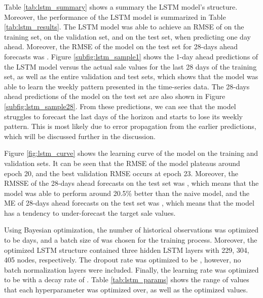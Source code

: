 Table \ref{tab:lstm_summary} shows a summary the LSTM model's structure. 
Moreover, the performance of the LSTM model is summarized in Table \ref{tab:lstm_results}.
The LSTM model was able to achieve an RMSE of \lstmTrnRMSE{} on the training set, \lstmValRMSE{} on the validation set, and \lstmTstRMSE{} on the test set, when predicting one day ahead.
Moreover, the RMSE of the model on the test set for 28-days ahead forecasts was \lstmTstMonRMSE{}.
Figure \ref{subfig:lstm_sample1} shows the 1-day ahead predictions of the LSTM model versus the actual sale values for the last 28 days of the training set, as well as the entire validation and test sets, which shows that the model was able to learn the weekly pattern presented in the time-series data.
The 28-days ahead predictions of the model on the test set are also shown in Figure \ref{subfig:lstm_sample28}.
From these predictions, we can see that the model struggles to forecast the last days of the horizon and starts to lose its weekly pattern.
This is most likely due to error propagation from the earlier predictions, which will be discussed further in the discussion.

Figure \ref{fig:lstm_curve} shows the learning curve of the model on the training and validation sets. 
It can be seen that the RMSE of the model plateaus around epoch 20, and the best validation RMSE occurs at epoch 23.
Moreover, the RMSSE of the 28-days ahead forecasts on the test set was \lstmTstMonRMSSE{}, which means that the model was able to perform around 20.5\% better than the naive model, and the ME of 28-days ahead forecasts on the test set was \lstmTstMonME{}, which means that the model has a tendency to under-forecast the target sale values. 

Using Bayesian optimization, the number of historical observations was optimized to be \lstmParamsSteps{} days, and a batch size of \lstmParamsBatch{} was chosen for the training process. 
Moreover, the optimized LSTM structure contained three hidden LSTM layers with 229, 304, 405 nodes, respectively. 
The dropout rate was optimized to be \lstmParamsDropout{}, however, no batch normalization layers were included.
Finally, the learning rate was optimized to be \lstmParamsLR{} with a decay rate of \lstmParamsDecay{}. 
Table \ref{tab:lstm_params} shows the range of values that each hyperparameter was optimized over, as well as the optimized values.

